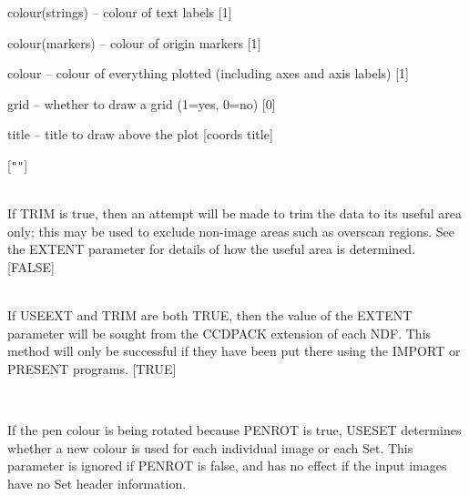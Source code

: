 \documentclass[twoside,11pt]{article}
\newcommand{\htmlref}[2]{#1}
\renewcommand{\_}{\texttt{\symbol{95}}}
\newcommand{\xroutine}[1]{\htmlref{{\sc #1}}{#1}}
\newcommand{\sstsubsection}[1]{ \item[{#1}] \mbox{} \\}
\newcommand{\sstitem}{\item}
\newcommand{\sstsubsection}[1]{\item[{#1}]}
\newcommand{\sstitem}{\item}
\begin{document}
{{{{            \sstitem
               colour(strings) -- colour of text labels [1]

            \sstitem
               colour(markers) -- colour of origin markers [1]

            \sstitem
               colour          -- colour of everything plotted
                                    (including axes and axis labels) [1]

            \sstitem
               grid            -- whether to draw a grid (1=yes, 0=no) [0]

            \sstitem
               title           -- title to draw above the plot [coords title]

         }
         [{\tt "}{\tt "}]
      }
      \sstsubsection{
         TRIM = \_LOGICAL (Read)
      }{
         If TRIM is true, then an attempt will be made to trim the data
         to its useful area only; this may be used to exclude non-image
         areas such as overscan regions.  See the EXTENT parameter for
         details of how the useful area is determined.
         [FALSE]
      }
      \sstsubsection{
         USEEXT = \_LOGICAL (Read)
      }{
         If USEEXT and TRIM are both TRUE, then the value of the EXTENT
         parameter will be sought from the CCDPACK extension of each
         NDF.  This method will only be successful if they have been
         put there using the \xroutine{IMPORT} or \xroutine{PRESENT} programs.
         [TRUE]
      }
      \sstsubsection{
         USESET = \_LOGICAL (Read)
      }{
         If the pen colour is being rotated because PENROT is true,
         USESET determines whether a new colour is used for each
         individual image or each Set.  This parameter is ignored if
         PENROT is false, and has no effect if the input images have
         no Set header information.

}}}
\end{document}

